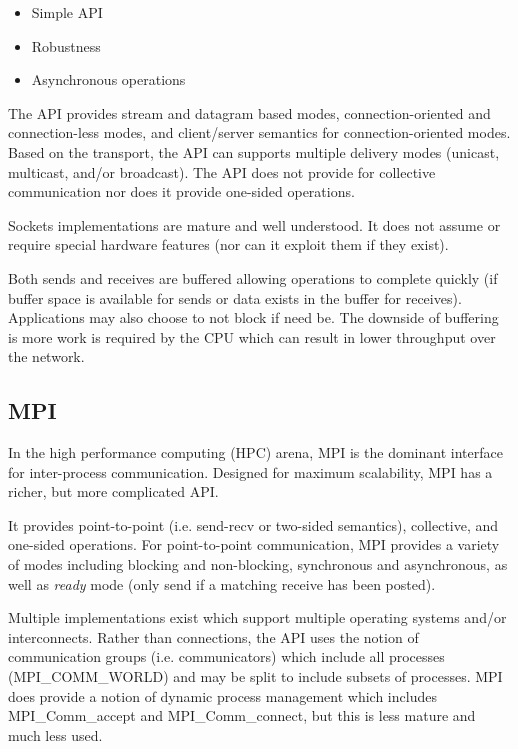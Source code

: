 \documentclass[conference]{IEEEtran}
\begin{document}
\begin{itemize}
\item Simple API
\item Robustness
\item Asynchronous operations
\end{itemize}

The API provides stream and datagram based modes, connection-oriented and connection-less
modes, and client/server semantics for connection-oriented modes. Based on the transport,
the API can supports multiple delivery modes (unicast, multicast, and/or broadcast). The
API does not provide for collective communication nor does it provide one-sided
operations.

Sockets implementations are mature and well understood. It does not assume or require
special hardware features (nor can it exploit them if they exist).

Both sends and receives are buffered allowing operations to complete quickly (if buffer
space is available for sends or data exists in the buffer for receives). Applications may
also choose to not block if need be. The downside of buffering is more work is required by
the CPU which can result in lower throughput over the network.

\subsection{MPI} In the high performance computing (HPC) arena, MPI is the dominant
interface for inter-process communication. Designed for maximum scalability, MPI has a
richer, but more complicated API.

It provides point-to-point (i.e. send-recv or two-sided semantics), collective, and
one-sided operations. For point-to-point communication, MPI provides a variety of modes
including blocking and non-blocking, synchronous and asynchronous, as well as \emph{ready}
mode (only send if a matching receive has been posted).

Multiple implementations exist\cite{ompi, mpich2, mvapich, intel-mpi, platform-mpi}
which support multiple operating systems and/or interconnects.  Rather than connections,
the API uses the notion of communication groups (i.e.  communicators) which include all
processes (MPI\_COMM\_WORLD) and may be split to include subsets of processes. MPI does
provide a notion of dynamic process management which includes MPI\_Comm\_accept and
MPI\_Comm\_connect, but this is less mature and much less used.
\end{document}
